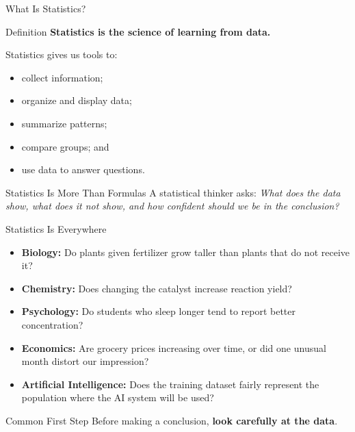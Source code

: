 \documentclass[aspectratio=169]{beamer}
\begin{document}
\begin{frame}{What Is Statistics?}
  \begin{block}{Definition}
    \textbf{Statistics is the science of learning from data.}
  \end{block}
  \vspace{0.15cm}
  Statistics gives us tools to:
  \begin{itemize}
    \item collect information;
    \item organize and display data;
    \item summarize patterns;
    \item compare groups; and
    \item use data to answer questions.
  \end{itemize}
  \vspace{0.15cm}
  \begin{alertblock}{Statistics Is More Than Formulas}
    A statistical thinker asks: \emph{What does the data show, what does it not show, and how confident should we be in the conclusion?}
  \end{alertblock}
\end{frame}

\begin{frame}{Statistics Is Everywhere}
  \begin{itemize}
    \item \textbf{Biology:} Do plants given fertilizer grow taller than plants that do not receive it?
    \item \textbf{Chemistry:} Does changing the catalyst increase reaction yield?
    \item \textbf{Psychology:} Do students who sleep longer tend to report better concentration?
    \item \textbf{Economics:} Are grocery prices increasing over time, or did one unusual month distort our impression?
    \item \textbf{Artificial Intelligence:} Does the training dataset fairly represent the population where the AI system will be used?
  \end{itemize}
  \vspace{0.2cm}
  \begin{block}{Common First Step}
    Before making a conclusion, \textbf{look carefully at the data}.
  \end{block}
\end{frame}
\end{document}

